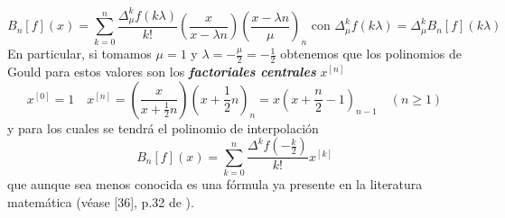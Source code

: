\begin{ej}
\begin{enumerate}
\begin{equation*}
            B_n[f](x) = \sum_{k=0}^n \frac{\Delta_{\mu}^k f(k \lambda)}{k!} \left(\frac{x}{x - \lambda n}\right)\left(\frac{x- \lambda n}{\mu}\right)_n \text{ con } \Delta_{\mu}^k f(k \lambda) = \Delta_{\mu}^k B_n[f](k \lambda)
        \end{equation*}
        En particular, si tomamos $\mu = 1$ y $\lambda = -\frac{\mu}{2} = -\frac{1}{2} $ obtenemos que los polinomios de Gould para estos valores son los \textit{\textbf{factoriales centrales}} $x^{[n]}$
        \begin{equation*}
            x^{[0]} = 1 \quad x^{[n]} = \left(\frac{x}{x + \frac{1}{2} n}\right)\left(x + \frac{1}{2} n\right)_n = x \left(x + \frac{n}{2} - 1\right)_{n-1} \quad (n \geq 1)
        \end{equation*}
        y para los cuales se tendrá el polinomio de interpolación 
        \begin{equation*}
            B_n[f](x) = \sum_{k=0}^n \frac{\Delta^k f(-\frac{k}{2})}{k!} x^{[k]}
        \end{equation*}
        que aunque sea menos conocida es una fórmula ya presente en la literatura matemática (véase [36], p.32 de \cite{steffensen}).
    \end{enumerate} 

\end{ej}

